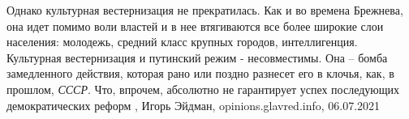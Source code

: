 Однако культурная вестернизация не прекратилась. Как и во времена Брежнева, она
идет помимо воли властей и в нее втягиваются все более широкие слои населения:
молодежь, средний класс крупных городов, интеллигенция.
Культурная вестернизация и путинский режим - несовместимы. Она – бомба
замедленного действия, которая рано или поздно разнесет его в клочья, как, в
прошлом, \emph{СССР}. Что, впрочем, абсолютно не гарантирует успех последующих
демократических реформ
, 
Игорь Эйдман, opinions.glavred.info, 06.07.2021
